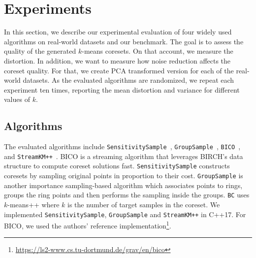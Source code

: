 \section{Experiments} \label{sec:experiments}
In this section, we describe our experimental evaluation of four widely used algorithms on real-world datasets and our benchmark. The goal is to assess the quality of the generated $k$-means coresets. On that account, we measure the distortion. In addition, we want to measure how noise reduction affects the coreset quality. For that, we create PCA transformed version for each of the real-world datasets. As the evaluated algorithms are randomized, we repeat each experiment ten times, reporting the mean distortion and variance for different values of $k$.


\subsection{Algorithms}
The evaluated algorithms include \texttt{SensitivitySample}~\cite{cohen2021new}, \texttt{GroupSample}~\cite{cohen2021new}, \texttt{BICO}~\cite{FGSSS13}, and \texttt{StreamKM++}~\cite{AckermannMRSLS12}. BICO is a streaming algorithm that leverages BIRCH's data structure to compute coreset solutions fast. \texttt{SensitivitySample} constructs coresets by sampling original points in proportion to their cost. \texttt{GroupSample} is another importance sampling-based algorithm which associates points to rings, groups the ring points and then performs the sampling inside the groups. \texttt{BC} uses $k$-means++ where $k$ is the number of target samples in the coreset. We implemented \texttt{SensitivitySample}, \texttt{GroupSample} and \texttt{StreamKM++} in C++17. For BICO, we used the authors' reference implementation\footnote{\url{https://ls2-www.cs.tu-dortmund.de/grav/en/bico}}. 


